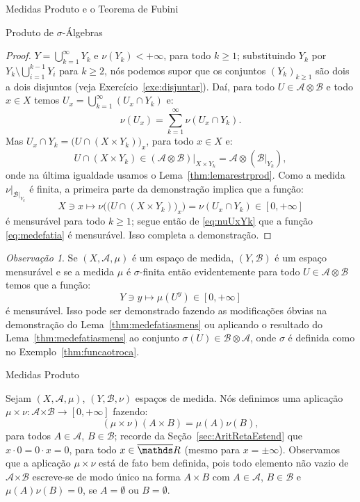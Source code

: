 \documentclass[oneside,final,11pt]{amsbook}
\newcommand{\R}{\mathds R}
\newcommand{\Times}{\pmb{\times}}
\theoremstyle{remark}\newtheorem{exercise}{Exercício}[chapter]
\theoremstyle{remark}\newtheorem{*exercise}[exercise]{\hbox to 0pt{\hskip 0pt minus 1fil*}Exercício}
\theoremstyle{definition}\newtheorem{exdefin}{Definição}[chapter]
\theoremstyle{plain}\newtheorem{teo}{Teorema}[section]
\theoremstyle{plain}\newtheorem{lem}[teo]{Lema}
\theoremstyle{plain}\newtheorem{prop}[teo]{Proposição}
\theoremstyle{plain}\newtheorem{cor}[teo]{Corolário}
\theoremstyle{definition}\newtheorem{defin}[teo]{Definição}
\theoremstyle{remark}\newtheorem{rem}[teo]{Observação}
\theoremstyle{definition}\newtheorem{notation}[teo]{Notação}
\theoremstyle{definition}\newtheorem{convention}[teo]{Convenção}
\theoremstyle{definition}\newtheorem{example}[teo]{Exemplo}
\numberwithin{section}{chapter}
\numberwithin{equation}{section}
\begin{document}
\begin{chapter}{Medidas Produto e o Teorema de Fubini}
\begin{section}{Produto de ${\sigma}$-Álgebras}
\begin{proof}
$Y=\bigcup_{k=1}^\infty Y_k$ e $\nu(Y_k)<+\infty$, para todo $k\ge1$; substituindo $Y_k$
por $Y_k\setminus\bigcup_{i=1}^{k-1}Y_i$ para $k\ge2$, nós podemos supor que os conjuntos $(Y_k)_{k\ge1}$ são
dois a dois disjuntos (veja Exercício~\ref{exe:disjuntar}). Daí, para todo $U\in\mathcal A\otimes\mathcal B$
e todo $x\in X$ temos $U_x=\bigcup_{k=1}^\infty(U_x\cap Y_k)$ e:
\begin{equation}\label{eq:nuUxYk}
\nu(U_x)=\sum_{k=1}^\infty\nu(U_x\cap Y_k).
\end{equation}
Mas $U_x\cap Y_k=\big(U\cap(X\times Y_k)\big)_x$, para todo $x\in X$ e:
\[U\cap(X\times Y_k)\in(\mathcal A\otimes\mathcal B)\vert_{X\times Y_k}=\mathcal A\otimes(\mathcal B\vert_{Y_k}),\]
onde na última igualdade usamos o Lema~\ref{thm:lemarestrprod}. Como a medida $\nu\vert_{\mathcal B\vert_{Y_k}}$
é finita, a primeira parte da demonstração implica que a função:
\[X\ni x\longmapsto\nu\Big(\big(U\cap(X\times Y_k)\big)_x\Big)=\nu(U_x\cap Y_k)\in[0,+\infty]\]
é mensurável para todo $k\ge1$; segue então de \eqref{eq:nuUxYk} que a função \eqref{eq:medefatia} é mensurável. Isso completa
a demonstração.
\end{proof}

\begin{rem}
Se $(X,\mathcal A,\mu)$ é um espaço de medida, $(Y,\mathcal B)$ é um espaço mensurável e se a medida $\mu$ é
$\sigma$-finita então evidentemente para todo $U\in\mathcal A\otimes\mathcal B$ temos que a função:
\[Y\ni y\longmapsto\mu(U^y)\in[0,+\infty]\]
é mensurável. Isso pode ser demonstrado fazendo as modificações óbvias na demonstração do Lema~\ref{thm:medefatiasmens}
ou aplicando o resultado do Lema~\ref{thm:medefatiasmens} ao conjunto $\sigma(U)\in\mathcal B\otimes\mathcal A$,
onde $\sigma$ é definida como no Exemplo~\ref{thm:funcaotroca}.
\end{rem}

\end{section}

\begin{section}{Medidas Produto}

Sejam $(X,\mathcal A,\mu)$, $(Y,\mathcal B,\nu)$ espaços de medida. Nós definimos
uma aplicação $\mu\times\nu:\mathcal A\Times\mathcal B\to[0,+\infty]$ fazendo:
\begin{equation}\label{eq:defmutimesnu}
(\mu\times\nu)(A\times B)=\mu(A)\nu(B),
\end{equation}
para todos $A\in\mathcal A$, $B\in\mathcal B$; recorde da Seção~\ref{sec:AritRetaEstend} que
$x\cdot 0=0\cdot x=0$, para todo $x\in\overline\R$ (mesmo
para $x=\pm\infty$). Observamos que a aplicação $\mu\times\nu$ está de fato bem
definida, pois todo elemento não vazio de $\mathcal A\Times\mathcal B$ escreve-se de modo
único na forma $A\times B$ com $A\in\mathcal A$, $B\in\mathcal B$ e
$\mu(A)\nu(B)=0$, se $A=\emptyset$ ou $B=\emptyset$.


\end{section}
\end{chapter}
\end{document}
